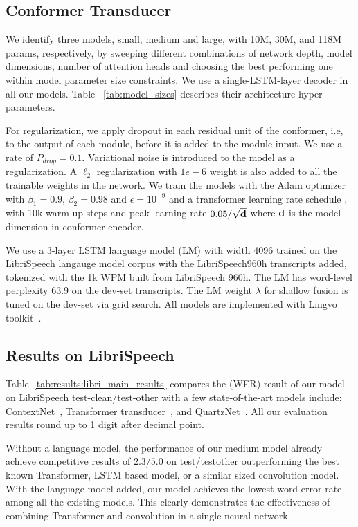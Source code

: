 \subsection{Conformer Transducer}

We identify three models, small, medium and large, with 10M, 30M, and 118M params, respectively, by sweeping different combinations of network depth, model dimensions, number of attention heads and choosing the best performing one within model parameter size constraints. We use a single-LSTM-layer decoder in all our models. Table ~\ref{tab:model_sizes} describes their architecture hyper-parameters. 

For regularization, we apply dropout \cite{JMLR:v15:srivastava14a} in each residual unit of the conformer, i.e, to the output of each module, before it is added to the module input. We use a rate of $P_{drop} = 0.1$. Variational noise \cite{graves2012sequence, jim1996analysis} is introduced to the model as a regularization. A $\ell_2$ regularization with $1e-6$ weight is also added to all the trainable weights in the network. We train the models with the Adam optimizer \cite{kingma2014adam} with $\beta_{1} = 0.9$, $\beta_{2} = 0.98$ and $\epsilon = 10^{-9}$ and a transformer learning rate schedule \cite{vaswani2017attention}, with 10k warm-up steps and peak learning rate $0.05/\sqrt{\bf{d}}$ where $\bf{d}$ is the model dimension in conformer encoder.   

We use a 3-layer LSTM language model (LM) with width 4096 trained on the LibriSpeech langauge model corpus with the LibriSpeech960h transcripts added, tokenized with the 1k WPM built from LibriSpeech 960h.  The LM has word-level perplexity 63.9 on the dev-set transcripts. The LM weight $\lambda$ for shallow fusion is tuned on the dev-set via grid search. All models are implemented with Lingvo toolkit~\cite{lingvo}.

\subsection{Results on LibriSpeech}

Table~\ref{tab:results:libri_main_results} compares the (WER) result of our model on LibriSpeech test-clean/test-other with a few state-of-the-art models include: ContextNet~\cite{han2020contextnet}, Transformer transducer~\cite{zhang2020transformer}, and QuartzNet~\cite{kriman2019quartznet}. All our evaluation results round up to 1 digit after decimal point.

Without a language model, the performance of our medium model already achieve competitive results of $2.3$/$5.0$ on test/testother outperforming the best known Transformer, LSTM based model, or a similar sized convolution model. With the language model added, our model achieves the lowest word error rate among all the existing models. This clearly demonstrates the effectiveness of combining Transformer and convolution in a single neural network. 

